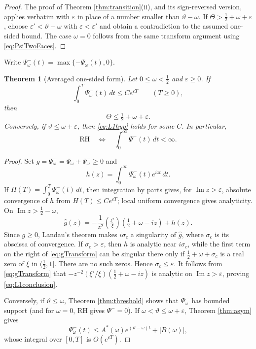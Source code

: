 \documentclass[11pt,reqno]{amsart}
\theoremstyle{plain}
\newtheorem{theorem}{Theorem}[section]
\theoremstyle{definition}
\newcommand{\Ip}{\operatorname{Im}}
\newcommand{\lxi}[1]{\left(\tfrac{\xi'}{\xi}\right)\!#1}
\begin{document}
\begin{proof}
The proof of Theorem \ref{thm:transition}(ii), and its sign-reversed version, applies verbatim with
$\varepsilon$ in place of a number smaller than $\vartheta-\omega$.  If
$\Theta>\tfrac12+\omega+\varepsilon$, choose
$\varepsilon'<\vartheta-\omega$ with $\varepsilon<\varepsilon'$ and obtain a contradiction to the
assumed one-sided bound.  The case $\omega=0$ follows from the same transform argument using
\eqref{eq:PsiTwoFaces}.
\end{proof}

Write $\Psi_\omega^-(t)=\max\{-\Psi_\omega(t),0\}$.

\begin{theorem}[Averaged one-sided form]\label{thm:L1}
Let $0\le\omega<\tfrac12$ and $\varepsilon\ge0$.  If
\begin{equation}\label{eq:L1hyp}
 \int_0^T\Psi_\omega^-(t)\,dt\le Ce^{\varepsilon T}
 \qquad(T\ge0),
\end{equation}
then
\begin{equation}\label{eq:L1conclusion}
 \Theta\le\tfrac12+\omega+\varepsilon.
\end{equation}
Conversely, if $\vartheta\le\omega+\varepsilon$, then \eqref{eq:L1hyp} holds for some $C$.
In particular,
\begin{equation}\label{eq:RHnegativePart}
 \mathrm{RH}
 \quad\Longleftrightarrow\quad
 \int_0^\infty\Psi^-(t)\,dt<\infty.
\end{equation}
\end{theorem}

\begin{proof}
Set $g=\Psi_\omega^+=\Psi_\omega+\Psi_\omega^-\ge0$ and
\[
 h(z)=\int_0^\infty\Psi_\omega^-(t)e^{izt}\,dt.
\]
If $H(T)=\int_0^T\Psi_\omega^-(t)\,dt$, then integration by parts gives, for
$\Ip z>\varepsilon$, absolute convergence of $h$ from $H(T)\le Ce^{\varepsilon T}$; local uniform
convergence gives analyticity.  On $\Ip z>\tfrac12-\omega$,
\begin{equation}\label{eq:gTransform}
 \widehat g(z)
 =-\frac1{z^2}\lxi{\left(\tfrac12+\omega-iz\right)}+h(z).
\end{equation}
Since $g\ge0$, Landau's theorem makes $i\sigma_c$ a singularity of $\widehat g$, where $\sigma_c$
is its abscissa of convergence.  If $\sigma_c>\varepsilon$, then $h$ is analytic near
$i\sigma_c$, while the first term on the right of \eqref{eq:gTransform} can be singular there only
if $\tfrac12+\omega+\sigma_c$ is a real zero of $\xi$ in $(\tfrac12,1]$.  There are no such zeros.
Hence $\sigma_c\le\varepsilon$.  It follows from \eqref{eq:gTransform} that
$-z^{-2}(\xi'/\xi)(\tfrac12+\omega-iz)$ is analytic on $\Ip z>\varepsilon$, proving
\eqref{eq:L1conclusion}.

Conversely, if $\vartheta\le\omega$, Theorem \ref{thm:threshold} shows that $\Psi_\omega^-$ has
bounded support (and for $\omega=0$, RH gives $\Psi^-=0$).  If
$\omega<\vartheta\le\omega+\varepsilon$, Theorem \ref{thm:asym} gives
\[
 \Psi_\omega^-(t)
 \le A^*(\omega)e^{(\vartheta-\omega)t}+|B(\omega)|,
\]
whose integral over $[0,T]$ is $O(e^{\varepsilon T})$.
\end{proof}
\end{document}
